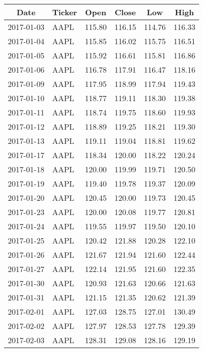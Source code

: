 \documentclass[a4paper, 12pt]{report}
\begin{document}
\begin{appendices}
\begin{longtable}{llllll}
  \hline
  \multicolumn{1}{c}{Date}   & \multicolumn{1}{c}{Ticker} & \multicolumn{1}{c}{Open}   & \multicolumn{1}{c}{Close} &  \multicolumn{1}{c}{Low}  &   \multicolumn{1}{c}{High}\\
  \hline
  \endhead
2017-01-03 & AAPL & 115.80 & 116.15 & 114.76 & 116.33 \\ 
  2017-01-04 & AAPL & 115.85 & 116.02 & 115.75 & 116.51 \\ 
  2017-01-05 & AAPL & 115.92 & 116.61 & 115.81 & 116.86 \\ 
  2017-01-06 & AAPL & 116.78 & 117.91 & 116.47 & 118.16 \\ 
  2017-01-09 & AAPL & 117.95 & 118.99 & 117.94 & 119.43 \\ 
  2017-01-10 & AAPL & 118.77 & 119.11 & 118.30 & 119.38 \\ 
  2017-01-11 & AAPL & 118.74 & 119.75 & 118.60 & 119.93 \\ 
  2017-01-12 & AAPL & 118.89 & 119.25 & 118.21 & 119.30 \\ 
  2017-01-13 & AAPL & 119.11 & 119.04 & 118.81 & 119.62 \\ 
  2017-01-17 & AAPL & 118.34 & 120.00 & 118.22 & 120.24 \\ 
  2017-01-18 & AAPL & 120.00 & 119.99 & 119.71 & 120.50 \\ 
  2017-01-19 & AAPL & 119.40 & 119.78 & 119.37 & 120.09 \\ 
  2017-01-20 & AAPL & 120.45 & 120.00 & 119.73 & 120.45 \\ 
  2017-01-23 & AAPL & 120.00 & 120.08 & 119.77 & 120.81 \\ 
  2017-01-24 & AAPL & 119.55 & 119.97 & 119.50 & 120.10 \\ 
  2017-01-25 & AAPL & 120.42 & 121.88 & 120.28 & 122.10 \\ 
  2017-01-26 & AAPL & 121.67 & 121.94 & 121.60 & 122.44 \\ 
  2017-01-27 & AAPL & 122.14 & 121.95 & 121.60 & 122.35 \\ 
  2017-01-30 & AAPL & 120.93 & 121.63 & 120.66 & 121.63 \\ 
  2017-01-31 & AAPL & 121.15 & 121.35 & 120.62 & 121.39 \\ 
  2017-02-01 & AAPL & 127.03 & 128.75 & 127.01 & 130.49 \\ 
  2017-02-02 & AAPL & 127.97 & 128.53 & 127.78 & 129.39 \\ 
  2017-02-03 & AAPL & 128.31 & 129.08 & 128.16 & 129.19 \\ 

\end{longtable}
\end{appendices}
\end{document}
